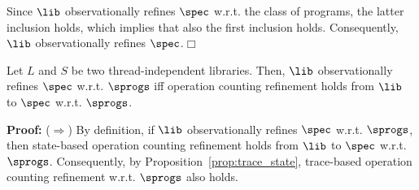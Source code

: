 Since $\lib$ observationally refines $\spec$ w.r.t. the class of {\simple} programs, the latter inclusion holds, which implies that also the first inclusion holds. Consequently, $\lib$ observationally refines $\spec$.\hfill$\Box$



%


\begin{lemma}\label{lemma:equiv2}
Let $L$ and $S$ be two thread-independent libraries. %
Then, $\lib$ observationally refines $\spec$ w.r.t. $\sprogs$ iff operation counting refinement holds from $\lib$ to $\spec$ w.r.t. $\sprogs$.
\end{lemma}
{\bf Proof:} 
($\Rightarrow$) 
By definition, if $\lib$ observationally refines $\spec$ w.r.t. $\sprogs$, then state-based operation counting refinement holds from $\lib$ to $\spec$ w.r.t. $\sprogs$. 
Consequently, by Proposition~\ref{prop:trace_state},  trace-based operation counting refinement w.r.t. $\sprogs$ also holds.

